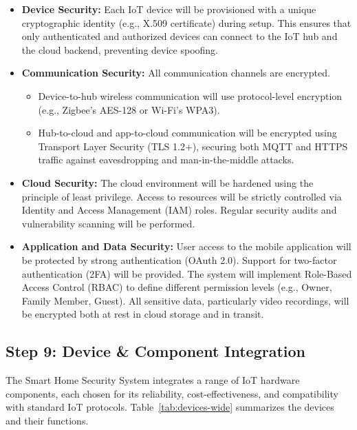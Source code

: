 \documentclass[conference]{IEEEtran}
\begin{document}
\begin{itemize}
    \item \textbf{Device Security:} Each IoT device will be provisioned with a unique cryptographic identity (e.g., X.509 certificate) during setup. This ensures that only authenticated and authorized devices can connect to the IoT hub and the cloud backend, preventing device spoofing.
    
    \item \textbf{Communication Security:} All communication channels are encrypted.
    \begin{itemize}
        \item Device-to-hub wireless communication will use protocol-level encryption (e.g., Zigbee's AES-128 or Wi-Fi's WPA3).
        \item Hub-to-cloud and app-to-cloud communication will be encrypted using Transport Layer Security (TLS 1.2+), securing both MQTT and HTTPS traffic against eavesdropping and man-in-the-middle attacks.
    \end{itemize}
    
    \item \textbf{Cloud Security:} The cloud environment will be hardened using the principle of least privilege. Access to resources will be strictly controlled via Identity and Access Management (IAM) roles. Regular security audits and vulnerability scanning will be performed.
    
    \item \textbf{Application and Data Security:} User access to the mobile application will be protected by strong authentication (OAuth 2.0). Support for two-factor authentication (2FA) will be provided. The system will implement Role-Based Access Control (RBAC) to define different permission levels (e.g., Owner, Family Member, Guest). All sensitive data, particularly video recordings, will be encrypted both at rest in cloud storage and in transit.
\end{itemize}

\subsection{Step 9: Device \& Component Integration}
The Smart Home Security System integrates a range of IoT hardware components, each chosen for its reliability, cost-effectiveness, and compatibility with standard IoT protocols. Table~\ref{tab:devices-wide} summarizes the devices and their functions.
\end{document}
